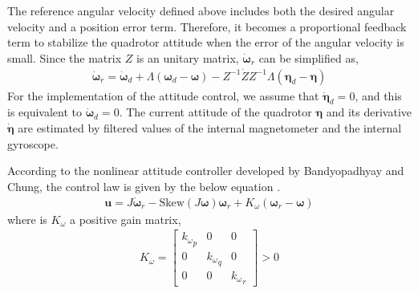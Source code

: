 The reference angular velocity defined above includes both the desired angular velocity and a position error term. Therefore, it becomes a proportional feedback term to stabilize the quadrotor attitude when the error of the angular velocity is small. Since the matrix \(Z\) is an unitary matrix, \({\dot {\boldsymbol \omega}_r} \) can be simplified as,\\
\begin{equation}
\begin{aligned}
{\dot {\boldsymbol \omega}_r} = {\dot {\boldsymbol \omega}_d} + \Lambda ({\boldsymbol \omega}_d - {\boldsymbol \omega}) - Z^{-1} {\dot Z} Z^{-1} \Lambda ({{\boldsymbol \eta}_d} - {\boldsymbol \eta})
\end{aligned}
\end{equation}
For the implementation of the attitude control, we assume that \( \ddot{\boldsymbol \eta}_d = 0\), and this is equivalent to \({\dot {\boldsymbol \omega}_d} = 0\). The current attitude of the quadrotor \( {\boldsymbol \eta} \) and its derivative \({\dot {\boldsymbol \eta}}\) are estimated by filtered values of the internal magnetometer and the internal gyroscope.

According to the nonlinear attitude controller developed by Bandyopadhyay and Chung, the control law is given by the below equation \cite{Bandyopadhyay16}. \\
\begin{equation}
\label{eq:control_law}
\begin{aligned}
\boldsymbol{u} = J {\dot {\boldsymbol \omega}_r} - \text{Skew} (J {\boldsymbol \omega}) {\boldsymbol \omega}_r + K_{\omega} ({\boldsymbol \omega}_r - {\boldsymbol \omega}) 
\end{aligned}
\end{equation}
where is \(K_{\omega}\) a positive gain matrix, \\
\begin{equation}
\begin{aligned}
K_{\omega} = 
\begin{bmatrix}
{k_{\omega}}_p& 0	 			& 0 \\
0			& {k_{\omega}}_q	& 0 \\
0			& 0				& {k_{\omega}}_r
\end{bmatrix}
>0
\end{aligned}
\end{equation}

